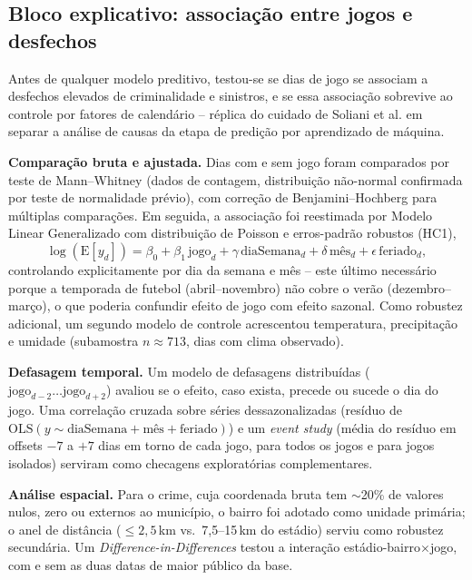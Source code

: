 \documentclass[12pt]{article}
\begin{document}
\subsection{Bloco explicativo: associação entre jogos e desfechos}

Antes de qualquer modelo preditivo, testou-se se dias de jogo se associam
a desfechos elevados de criminalidade e sinistros, e se essa associação
sobrevive ao controle por fatores de calendário -- réplica do cuidado de
Soliani et al. \cite{soliani2024} em separar a análise de causas da etapa
de predição por aprendizado de máquina.

\textbf{Comparação bruta e ajustada.} Dias com e sem jogo foram
comparados por teste de Mann--Whitney (dados de contagem, distribuição
não-normal confirmada por teste de normalidade prévio), com correção de
Benjamini--Hochberg \cite{bh1995} para múltiplas comparações. Em seguida,
a associação foi reestimada por Modelo Linear Generalizado com
distribuição de Poisson e erros-padrão robustos (HC1),
\begin{equation}
\log(\mathrm{E}[y_d]) = \beta_0 + \beta_1\,\text{jogo}_d +
  \gamma\,\text{diaSemana}_d + \delta\,\text{mês}_d + \epsilon\,\text{feriado}_d,
\end{equation}
controlando explicitamente por dia da semana e mês -- este último
necessário porque a temporada de futebol (abril--novembro) não cobre o
verão (dezembro--março), o que poderia confundir efeito de jogo com
efeito sazonal. Como robustez adicional, um segundo modelo de controle
acrescentou temperatura, precipitação e umidade (subamostra
$n\approx713$, dias com clima observado).

\textbf{Defasagem temporal.} Um modelo de defasagens distribuídas
($\text{jogo}_{d-2}\ldots\text{jogo}_{d+2}$) avaliou se o efeito, caso
exista, precede ou sucede o dia do jogo. Uma correlação cruzada sobre
séries dessazonalizadas (resíduo de
$\text{OLS}(y \sim \text{diaSemana} + \text{mês} + \text{feriado})$) e um
\emph{event study} (média do resíduo em offsets $-7$ a $+7$ dias em
torno de cada jogo, para todos os jogos e para jogos isolados) serviram
como checagens exploratórias complementares.

\textbf{Análise espacial.} Para o crime, cuja coordenada bruta tem
$\sim$20\% de valores nulos, zero ou externos ao município, o bairro foi
adotado como unidade primária; o anel de distância ($\leq2,5$\,km vs.\
7,5--15\,km do estádio) serviu como robustez secundária. Um
\emph{Difference-in-Differences} testou a interação
estádio-bairro$\times$jogo, com e sem as duas datas de maior público da
base.
\end{document}
